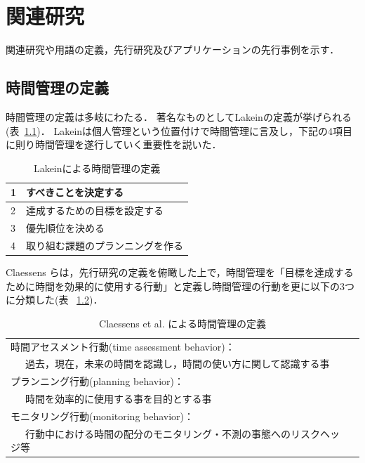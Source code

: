 \chapter{関連研究}
関連研究や用語の定義，先行研究及びアプリケーションの先行事例を示す．

\section{時間管理の定義}
時間管理の定義は多岐にわたる．
著名なものとしてLakeinの定義\cite{Lakein1989}が挙げられる(表~\ref{tb:Lakein})．
Lakeinは個人管理という位置付けで時間管理に言及し，下記の4項目に則り時間管理を遂行していく重要性を説いた．

\begin{table}[htb]
\begin{center}
  \begin{tabular}{|l|l|} \hline
   1 & すべきことを決定する \\ \hline
   2 & 達成するための目標を設定する \\ \hline
   3 & 優先順位を決める \\ \hline
   4 & 取り組む課題のプランニングを作る \\ \hline
  \end{tabular}
  \caption{Lakeinによる時間管理の定義}
  \label{tb:Lakein}
\end{center}
\end{table}

Claessens らは，先行研究の定義を俯瞰した上で，時間管理を「目標を達成するために時間を効果的に使用する行動」と定義し時間管理の行動を更に以下の3つに分類した\cite{Claessens2007}(表 ~\ref{tb:Claessens})．

\begin{table}[htb]
\begin{center}
  \begin{tabular}{|l|l|} \hline
   時間アセスメント行動(time assessment behavior)： \\ ~~~過去，現在，未来の時間を認識し，時間の使い方に関して認識する事 \\ \hline
   プランニング行動(planning behavior)：　\\  ~~~時間を効率的に使用する事を目的とする事 \\ \hline
   モニタリング行動(monitoring behavior)： \\ ~~~行動中における時間の配分のモニタリング・不測の事態へのリスクヘッジ等 \\ \hline
  \end{tabular}
  \caption{Claessens et al. による時間管理の定義}
  \label{tb:Claessens}
\end{center}
\end{table}

